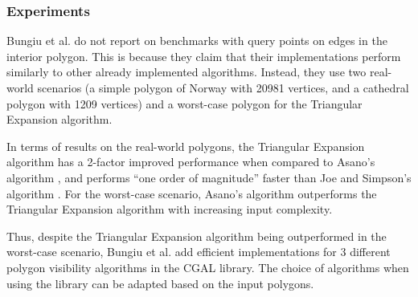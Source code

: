 \subsubsection{Experiments}
Bungiu et al. do not report on benchmarks with query points on edges in the interior polygon. This is because they claim that their implementations perform similarly to other already implemented algorithms. Instead, they use two real-world scenarios (a simple polygon of Norway with 20981 vertices, and a cathedral polygon with 1209 vertices) and a worst-case polygon for the Triangular Expansion algorithm.

In terms of results on the real-world polygons, the Triangular Expansion algorithm has a 2-factor improved performance when compared to Asano's algorithm \cite{asano1985efficient}, and performs ``one order of magnitude'' faster than Joe and Simpson's algorithm \cite{joe1987corrections}. For the worst-case scenario, Asano's algorithm \cite{asano1985efficient} outperforms the Triangular Expansion algorithm with increasing input complexity.

Thus, despite the Triangular Expansion algorithm being outperformed in the worst-case scenario, Bungiu et al. add efficient implementations for  3 different  polygon visibility algorithms in the CGAL library. The choice of algorithms when using the library can be adapted based on the input polygons. 

